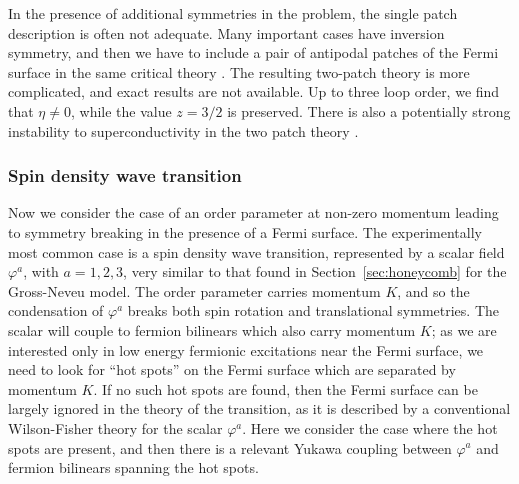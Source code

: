 \documentclass[10pt, oneside]{book}
\begin{document}
\begin{doublespace}
In the presence of additional symmetries in the problem, the single patch description is often not adequate. 
Many important cases have inversion symmetry, and then we have to include a pair of antipodal patches of the 
Fermi surface in the same critical theory \cite{metlitski1,mross}. 
The resulting two-patch theory is more complicated, and exact results are not available.
Up to three loop order, we find that $\eta \neq 0$, while the value $z=3/2$ is preserved. 
There is also a potentially strong instability to 
superconductivity in the two patch theory \cite{metlitski5}.

\subsubsection{Spin density wave transition}
\label{sec:sdw}

Now we consider the case of an order parameter at non-zero momentum leading to symmetry breaking in the 
presence of a Fermi surface. The experimentally most common case is a spin density wave transition, represented by
a scalar field $\varphi^a$, with $a=1,2,3$, very similar to that found in Section~\ref{sec:honeycomb} for the Gross-Neveu model.
The order parameter carries momentum $K$, and so the condensation of $\varphi^a$ breaks both spin rotation and translational
symmetries. The scalar will couple to fermion bilinears which also carry momentum $K$; as we are interested only in 
low energy fermionic excitations near the Fermi surface, we need to look for ``hot spots'' on the Fermi surface which 
are separated by momentum $K$. If no such hot spots are found, then the Fermi surface can be largely ignored in the theory
of the transition, as it is described by a conventional Wilson-Fisher theory for the scalar $\varphi^a$.
Here we consider the case where the hot spots are present, and then there is a relevant 
Yukawa coupling between $\varphi^a$ and fermion bilinears spanning the hot spots.


\end{doublespace}
\end{document}
